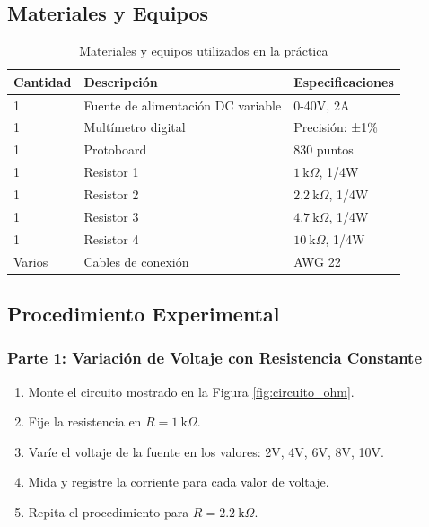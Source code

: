 \documentclass[12pt]{article}
\begin{document}
\subsection{Materiales y Equipos}
\begin{table}[h]
    \centering
    \caption{Materiales y equipos utilizados en la práctica}
    \label{tab:materiales}
    \begin{tabular}{@{}lp{8cm}l@{}}
        \toprule
        \textbf{Cantidad} & \textbf{Descripción} & \textbf{Especificaciones} \\
        \midrule
        1 & Fuente de alimentación DC variable & 0-40V, 2A \\
        1 & Multímetro digital & Precisión: ±1\% \\
        1 & Protoboard & 830 puntos \\
        1 & Resistor 1 & $1\ \text{k}\Omega$, 1/4W \\
        1 & Resistor 2 & $2.2\ \text{k}\Omega$, 1/4W \\
        1 & Resistor 3 & $4.7\ \text{k}\Omega$, 1/4W \\
        1 & Resistor 4 & $10\ \text{k}\Omega$, 1/4W \\
        Varios & Cables de conexión & AWG 22 \\
        \bottomrule
    \end{tabular}
\end{table}

\subsection{Procedimiento Experimental}
\subsubsection{Parte 1: Variación de Voltaje con Resistencia Constante}
\begin{enumerate}
    \item Monte el circuito mostrado en la Figura \ref{fig:circuito_ohm}.
    \item Fije la resistencia en $R = 1\ \text{k}\Omega$.
    \item Varíe el voltaje de la fuente en los valores: 2V, 4V, 6V, 8V, 10V.
    \item Mida y registre la corriente para cada valor de voltaje.
    \item Repita el procedimiento para $R = 2.2\ \text{k}\Omega$.
\end{enumerate}
\end{document}
